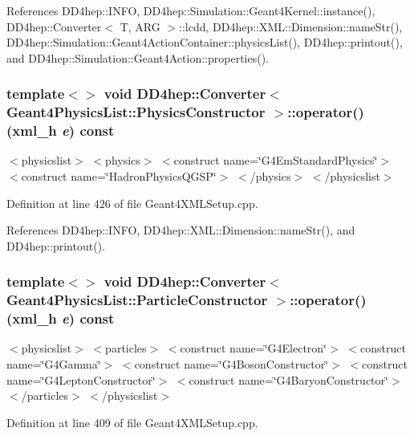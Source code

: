 References DD4hep::INFO, DD4hep::Simulation::Geant4Kernel::instance(), DD4hep::Converter$<$ T, ARG $>$::lcdd, DD4hep::XML::Dimension::nameStr(), DD4hep::Simulation::Geant4ActionContainer::physicsList(), DD4hep::printout(), and DD4hep::Simulation::Geant4Action::properties().\hypertarget{struct_d_d4hep_1_1_converter_a0244075da8fd0ca3f58cb2d3f1eae1e5}{
\subsubsection[{operator()}]{\setlength{\rightskip}{0pt plus 5cm}template$<$$>$ void {\bf DD4hep::Converter}$<$ {\bf Geant4PhysicsList::PhysicsConstructor} $>$::operator() ({\bf xml\_\-h} {\em e}) const}}
\label{struct_d_d4hep_1_1_converter_a0244075da8fd0ca3f58cb2d3f1eae1e5}
$<$physicslist$>$ $<$physics$>$ $<$construct name=\char`\"{}G4EmStandardPhysics\char`\"{}$>$ $<$construct name=\char`\"{}HadronPhysicsQGSP\char`\"{}$>$ $<$/physics$>$ $<$/physicslist$>$ 

Definition at line 426 of file Geant4XMLSetup.cpp.

References DD4hep::INFO, DD4hep::XML::Dimension::nameStr(), and DD4hep::printout().\hypertarget{struct_d_d4hep_1_1_converter_ad630b853386efd9e8fdefe008f1ecd4f}{
\subsubsection[{operator()}]{\setlength{\rightskip}{0pt plus 5cm}template$<$$>$ void {\bf DD4hep::Converter}$<$ {\bf Geant4PhysicsList::ParticleConstructor} $>$::operator() ({\bf xml\_\-h} {\em e}) const}}
\label{struct_d_d4hep_1_1_converter_ad630b853386efd9e8fdefe008f1ecd4f}
$<$physicslist$>$ $<$particles$>$ $<$construct name=\char`\"{}G4Electron\char`\"{}$>$ $<$construct name=\char`\"{}G4Gamma\char`\"{}$>$ $<$construct name=\char`\"{}G4BosonConstructor\char`\"{}$>$ $<$construct name=\char`\"{}G4LeptonConstructor\char`\"{}$>$ $<$construct name=\char`\"{}G4BaryonConstructor\char`\"{}$>$ $<$/particles$>$ $<$/physicslist$>$ 

Definition at line 409 of file Geant4XMLSetup.cpp.

